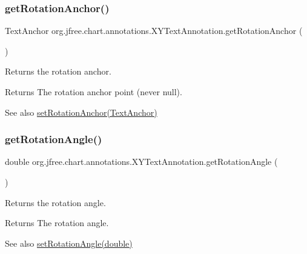 \subsubsection{\texorpdfstring{get\+Rotation\+Anchor()}{getRotationAnchor()}}
{\footnotesize\ttfamily Text\+Anchor org.\+jfree.\+chart.\+annotations.\+X\+Y\+Text\+Annotation.\+get\+Rotation\+Anchor (\begin{DoxyParamCaption}{ }\end{DoxyParamCaption})}

Returns the rotation anchor.

\begin{DoxyReturn}{Returns}
The rotation anchor point (never {\ttfamily null}).
\end{DoxyReturn}
\begin{DoxySeeAlso}{See also}
\mbox{\hyperlink{classorg_1_1jfree_1_1chart_1_1annotations_1_1_x_y_text_annotation_a7590b489d1fdc04821f4c847ed4eec8d}{set\+Rotation\+Anchor(\+Text\+Anchor)}} 
\end{DoxySeeAlso}
\mbox{\label{classorg_1_1jfree_1_1chart_1_1annotations_1_1_x_y_text_annotation_ac62f67f0468e2a3dd09d380c5e1cfa9d}} 
\subsubsection{\texorpdfstring{get\+Rotation\+Angle()}{getRotationAngle()}}
{\footnotesize\ttfamily double org.\+jfree.\+chart.\+annotations.\+X\+Y\+Text\+Annotation.\+get\+Rotation\+Angle (\begin{DoxyParamCaption}{ }\end{DoxyParamCaption})}

Returns the rotation angle.

\begin{DoxyReturn}{Returns}
The rotation angle.
\end{DoxyReturn}
\begin{DoxySeeAlso}{See also}
\mbox{\hyperlink{classorg_1_1jfree_1_1chart_1_1annotations_1_1_x_y_text_annotation_ae7a0ba2a95a356a1b81440986a37f321}{set\+Rotation\+Angle(double)}} 
\end{DoxySeeAlso}
\mbox{\label{classorg_1_1jfree_1_1chart_1_1annotations_1_1_x_y_text_annotation_a514ee0839698db4814f9c2c547e933b7}} 
